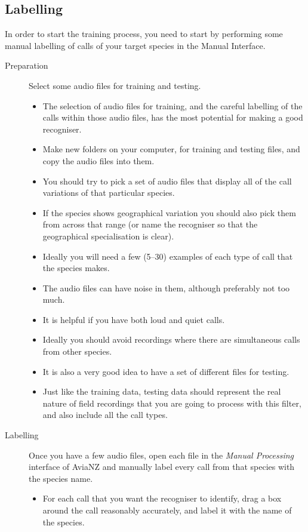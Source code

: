 \documentclass{scrartcl}
\begin{document}
\subsection{Labelling}

In order to start the training process, you need to start by performing some manual labelling of calls of your target species in the Manual Interface.

\begin{description}
\item[Preparation] Select some audio files for training and testing. 
\begin{itemize}
\item The selection of audio files for training, and the careful labelling of the calls within those audio files, has the most potential for making a good recogniser. 
\item Make new folders on your computer, for training and testing files, and copy the audio files into them.
\item You should try to pick a set of audio files that display all of the call variations of that particular species. 
\item If the species shows geographical variation you should also pick them from across that range (or name the recogniser so that the geographical specialisation is clear).  
\item Ideally you will need a few (5--30) examples of each type of call that the species makes. 
\item The audio files can have noise in them, although preferably not too much. 
\item It is helpful if you have both loud and quiet calls. 
\item Ideally you should avoid recordings where there are simultaneous calls from other species.
\item It is also a very good idea to have a set of different files for testing.
\item Just like the training data, testing data should represent the real nature of field recordings that you are going to process with this filter, and also include all the call types.
\end{itemize}
\item[Labelling] Once you have a few audio files, open each file in the \textit{Manual Processing} interface of AviaNZ and manually label every call from that species with the species name.
\begin{itemize}
\item For each call that you want the recogniser to identify, drag a box around the call reasonably accurately, and label it with the name of the species.

\end{itemize}
\end{description}
\end{document}
